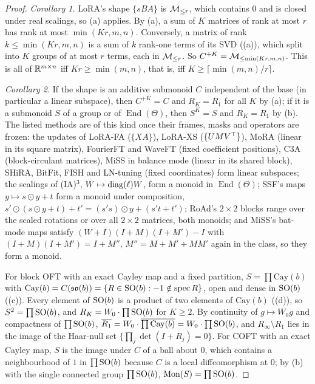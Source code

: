 \begin{proof}
\emph{Corollary 1.} LoRA's shape $\{sBA\}$ is $\mathcal{M}_{\le r}$, which contains $0$ and is closed under real scalings, so (a) applies.
By (a), a sum of $K$ matrices of rank at most $r$ has rank at most $\min(Kr,m,n)$. Conversely, a matrix of rank
$k\le\min(Kr,m,n)$ is a sum of $k$ rank-one terms of its SVD ((a)), which split into $K$ groups of at most $r$
terms, each in $\mathcal{M}_{\le r}$. So $C^{+K}=\mathcal{M}_{\le\min(Kr,m,n)}$. This is all of $\mathbb{R}^{m\times n}$ iff $Kr\ge\min(m,n)$, that is,
iff $K\ge\lceil\min(m,n)/r\rceil$.

\emph{Corollary 2.} If the shape is an additive submonoid $C$ independent of the base (in particular a linear subspace),
then $C^{+K}=C$ and $R_K=R_1$ for all $K$ by (a); if it is a submonoid $S$ of a group or of $\operatorname{End}(\Theta)$,
then $S^K=S$ and $R_K=R_1$ by (b). The listed methods are of this kind once their frames, masks and operators are frozen:
the updates of LoRA-FA ($\{XA\}$), LoRA-XS ($\{UMV^{\top}\}$), MoRA (linear in its square matrix), FourierFT and WaveFT (fixed
coefficient positions), C3A (block-circulant matrices), MiSS in balance mode (linear in its shared block), SHiRA, BitFit,
FISH and LN-tuning (fixed coordinates) form linear subspaces; the scalings of (IA)$^3$, $W\mapsto\operatorname{diag}(\ell)W$, form a
monoid in $\operatorname{End}(\Theta)$; SSF's maps $y\mapsto s\odot y+t$ form a monoid under composition,
$s'\odot(s\odot y+t)+t'=(s's)\odot y+(s't+t')$; RoAd's $2\times2$ blocks range over the scaled rotations or over all
$2\times2$ matrices, both monoids; and MiSS's bat-mode maps satisfy $(W+I)(I+M)(I+M')-I$ with $(I+M)(I+M')=I+M''$,
$M''=M+M'+MM'$ again in the class, so they form a monoid.

For block OFT with an exact Cayley map and a fixed partition, $S=\prod\mathrm{Cay}(b)$ with
$\mathrm{Cay}(b)=C(\mathfrak{so}(b))=\{R\in\mathrm{SO}(b):-1\notin\operatorname{spec}R\}$, open and dense in $\mathrm{SO}(b)$ ((c)). Every
element of $\mathrm{SO}(b)$ is a product of two elements of $\mathrm{Cay}(b)$ ((d)), so $S^2=\prod\mathrm{SO}(b)$, and
$R_K=W_0\cdot\prod\mathrm{SO}(b)$ for $K\ge2$. By continuity of $g\mapsto W_0g$ and compactness of $\prod\mathrm{SO}(b)$,
$\overline{R_1}=W_0\cdot\overline{\prod\mathrm{Cay}(b)}=W_0\cdot\prod\mathrm{SO}(b)$, and $R_\infty\setminus R_1$ lies in the image
of the Haar-null set $\{\prod_j\det(I+R_j)=0\}$. For COFT with an exact Cayley map, $S$ is the image under $C$ of a ball
about $0$, which contains a neighbourhood of $1$ in $\prod\mathrm{SO}(b)$ because $C$ is a local diffeomorphism at $0$; by (b) with
the single connected group $\prod\mathrm{SO}(b)$, $\operatorname{Mon}(S)=\prod\mathrm{SO}(b)$.


\end{proof}
